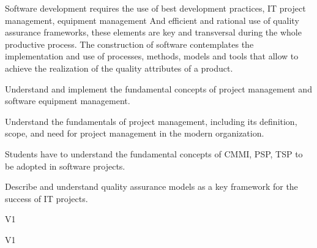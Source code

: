 \begin{syllabus}


\begin{justification}
Software development requires the use of best development practices, IT project management, equipment management
And efficient and rational use of quality assurance frameworks, these elements are key and transversal during the whole productive process.
The construction of software contemplates the implementation and use of processes, methods, models and tools that allow to achieve the realization of the quality attributes of a product.
\end{justification}

\begin{goals}
  \item Understand and implement the fundamental concepts of project management and software equipment management.
  \item Understand the fundamentals of project management, including its definition, scope, and need for project management in the modern organization.
  \item Students have to understand the fundamental concepts of CMMI, PSP, TSP to be adopted in software projects.
  \item Describe and understand quality assurance models as a key framework for the success of IT projects.
\end{goals}

\begin{outcomes}{V1}
    \item {}
    \item {}
    \item {}
    \item {}
    \item {}
    \item {}
\end{outcomes}

\begin{competences}{V1}
    \item {} 
    \item {}
    \item {} 
    \item {} 
    \item {} 
    \item {} 
    \item {} 
    \item {} 
    \item {}  
\end{competences}


\end{syllabus}
